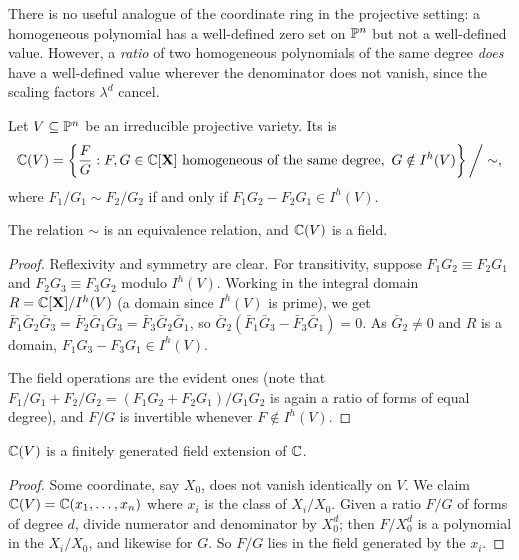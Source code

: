 \documentclass[a4paper]{scrartcl}
\begin{document}
There is no useful analogue of the coordinate ring in the projective setting: a homogeneous polynomial has a well-defined zero set on $\mathbb{P}^n$ but not a well-defined value. However, a \emph{ratio} of two homogeneous polynomials of the same degree \emph{does} have a well-defined value wherever the denominator does not vanish, since the scaling factors $\lambda^d$ cancel.

\begin{definition}
	Let $V \subseteq \mathbb{P}^n$ be an irreducible projective variety. Its  is
	$$\mathbb{C}(V) = \left\{ \frac{F}{G} : F,G \in \mathbb{C}[\mathbf X] \text{ homogeneous of the same degree},\ G \notin I^h(V)\right\}\bigg/ \sim,$$
	where $F_1/G_1 \sim F_2/G_2$ if and only if $F_1G_2 - F_2G_1 \in I^h(V)$.
\end{definition}

\begin{lemma}
	The relation $\sim$ is an equivalence relation, and $\mathbb{C}(V)$ is a field.
\end{lemma}

\begin{proof}
	Reflexivity and symmetry are clear. For transitivity, suppose $F_1G_2 \equiv F_2G_1$ and $F_2G_3 \equiv F_3G_2$ modulo $I^h(V)$. Working in the integral domain $R = \mathbb{C}[\mathbf X]/I^h(V)$ (a domain since $I^h(V)$ is prime), we get $\bar F_1 \bar G_2 \bar G_3 = \bar F_2\bar G_1\bar G_3 = \bar F_3 \bar G_2 \bar G_1$, so $\bar G_2(\bar F_1 \bar G_3 - \bar F_3\bar G_1) = 0$. As $\bar G_2 \neq 0$ and $R$ is a domain, $F_1G_3 - F_3G_1 \in I^h(V)$.

	The field operations are the evident ones (note that $F_1/G_1 + F_2/G_2 = (F_1G_2+F_2G_1)/G_1G_2$ is again a ratio of forms of equal degree), and $F/G$ is invertible whenever $F \notin I^h(V)$.
\end{proof}

\begin{proposition}
	$\mathbb{C}(V)$ is a finitely generated field extension of $\mathbb{C}$.
\end{proposition}

\begin{proof}
	Some coordinate, say $X_0$, does not vanish identically on $V$. We claim $\mathbb{C}(V) = \mathbb{C}(x_1,\dots,x_n)$ where $x_i$ is the class of $X_i/X_0$. Given a ratio $F/G$ of forms of degree $d$, divide numerator and denominator by $X_0^d$; then $F/X_0^d$ is a polynomial in the $X_i/X_0$, and likewise for $G$. So $F/G$ lies in the field generated by the $x_i$.
\end{proof}
\end{document}
